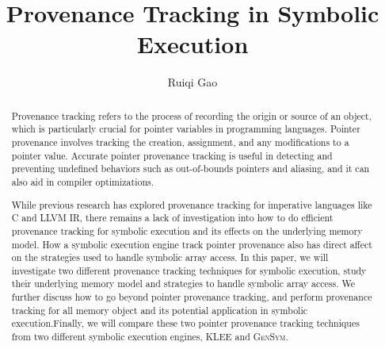 \documentclass[sigplan, nonacm]{acmart}\settopmatter{printfolios=true,printccs=false,printacmref=false}
\newcommand{\tool}{\textsc{GenSym}\xspace}
\newcommand{\klee}{\textsc{KLEE}\xspace}
\begin{document}
\sloppy

\title{Provenance Tracking in Symbolic Execution}

\author{Ruiqi Gao}

\begin{abstract}
Provenance tracking refers to the process of recording the origin or source of an object, which is particularly crucial for pointer variables in programming languages. Pointer provenance involves tracking the creation, assignment, and any modifications to a pointer value. Accurate pointer provenance tracking is useful in detecting and preventing undefined behaviors such as out-of-bounds pointers and aliasing, and it can also aid in compiler optimizations. \par

While previous research has explored provenance tracking for imperative languages like C and LLVM IR, there remains a lack of investigation into how to do efficient provenance tracking for symbolic execution and its effects on the underlying memory model. How a symbolic execution engine track pointer provenance also has direct affect on the strategies used to handle symbolic array access. In this paper, we will investigate two different provenance tracking techniques for symbolic execution, study their underlying memory model and strategies to handle symbolic array access. We further discuss how to go beyond pointer provenance tracking, and perform provenance tracking for all memory object and its potential application in symbolic execution.Finally, we will compare these two pointer provenance tracking techniques from two different symbolic execution engines, \klee and \tool.
\end{abstract}
\end{document}
